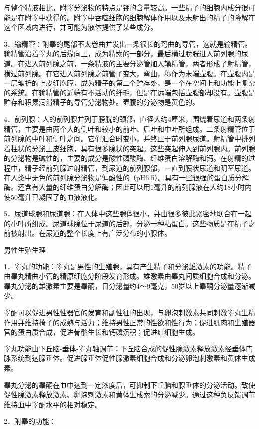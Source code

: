 \documentclass[12pt,UTF8,openany]{ctexbook}
\begin{document}
与整个精液相比，附睾分泌物的特点是钾的含量较高。一些精子的细胞内成分很可能是在附睾中获得的。附睾中吞噬细胞的细胞解体作用以及未射出的精子的降解在这个区域内进行，并可能为液体提供了某些成分。

3．输精管：附睾的尾部不太卷曲并发出一条很长的弯曲的导管，这就是输精管。输精管沿着睾丸的后缘向上，成为精索的一部分，最后横过膀胱进入前列腺的尿道。在进入前列腺之前，一条精液的主要分泌管加入输精管，两者形成了射精管，横过前列腺。在它进入前列腺之前管子变大，弯曲，称作为末端壶腹。在壶腹内是一层皱折的上皮细胞膜，成为精子的第二个贮存处，是一个在空间上和功能上复杂的系统。在输精管的近端有不活动的纤毛，但是在远端包括壶腹部却没有。壶腹是贮存和积累润滑精子的导管分泌物处。壶腹的分泌物是黄色的。

4．前列腺：人的前列腺并列于膀胱的颈部，直径大约4厘米，围绕着尿道和两条射精管，主要是由两个大的侧叶和较小的前叶、后叶和中叶所组成。二条射精管位于前列腺的中叶和侧叶之间。它们汇合时变小，并终止于前列腺尿道。射精管中排列着柱状的分泌上皮细胞，具有很多腺状的突起。这些突起伸入到前列腺内。前列腺的分泌物是碱性的，主要的成分是酸性磷酸酶、纤维蛋白溶解酶和钙。在射精的过程中，精子经前列腺过射精管，到尿道的前列腺部，一直到膜状尿道和阴茎尿道。在人类中无色的前列腺分泌物是偏酸性的（pH6.5）。具有一些很强的蛋白质分解酶。还含有大量的纤维蛋白分解酶；因此可以用1毫升的前列腺液在大约18小时内使50毫升已凝固了的血液液化。

5．尿道球腺和尿道腺：在人体中这些腺体很小，并由很多彼此紧密地联合在一起的小叶所组成。尿道球腺位于尿道的后部，分泌一种粘蛋白。这些物质是在精子之前被射出。在尿道的整个长度上有广泛分布的小腺体。

男性生殖生理

1．睾丸的功能：睾丸是男性的生殖腺，具有产生精子和分泌雄激素的功能。精子由睾丸精曲小管的精原细胞分阶段发育形成。雄激素由睾丸间质细胞合成和分泌。睾丸分泌的雄激素主要是睾酮，日分泌量约4～9毫克，50岁以上睾酮分泌量逐渐减少。

睾酮可以促进男性性器官的发育和副性征的出现，与卵泡刺激素共同刺激睾丸生精作用并维持椅子的成熟与活力；维持男性正常的性欲和性行为；促进肌肉和生殖器官的蛋白质合成，促进骨骼生长和钙磷沉积；促进红细胞生成。

睾丸功能由下丘脑-垂体-睾丸轴调节：下丘脑合成的促性腺激素释放激素经垂体门脉系统到达腺垂体。促进腺垂体促性腺激素细胞合成和分泌卵泡刺激素和黄体生成素。

睾丸分泌的睾酮在血中达到一定浓度后，可抑制下丘脑和腺垂体的分泌活动。致使促性腺激素释放激素、卵泡刺激素和黄体生成索的分泌减少。通过这种负反馈调节维持血中睾酮水平的相对稳定。

2．附睾的功能：
\end{document}
